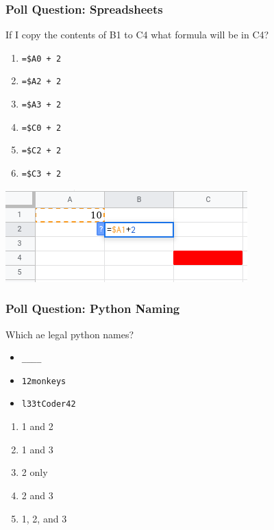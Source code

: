 \documentclass{beamer}
\begin{document}
%
%
%
\begin{frame}[fragile]
  \frametitle{Poll Question: Spreadsheets}
  If I copy the contents of B1 to C4 what formula will be in C4?
  \vfill
  \begin{minipage}{.48\textwidth}
    \begin{enumerate}
      \item \lstinline{=$A0 + 2}
      \item \lstinline{=$A2 + 2}
      \item \lstinline{=$A3 + 2}
      \item \lstinline{=$C0 + 2}
      \item \lstinline{=$C2 + 2}
      \item \lstinline{=$C3 + 2}
    \end{enumerate}
  \end{minipage}
  \begin{minipage}{.48\textwidth}
    \includegraphics[width=\textwidth]{./imgs/spreadsheet-slide-1.png}
  \end{minipage}
\end{frame}

%
%
%
\begin{frame}[fragile]
  \frametitle{Poll Question: Python Naming}
  Which ae legal python names?
  \begin{itemize}
    \item \lstinline{____}
    \item \lstinline{12monkeys}
    \item \lstinline{l33tCoder42}
  \end{itemize}
  \begin{enumerate}
    \item 1 and 2
    \item 1 and 3
    \item 2 only
    \item 2 and 3
    \item 1, 2, and 3
  \end{enumerate}
\end{frame}
\end{document}
